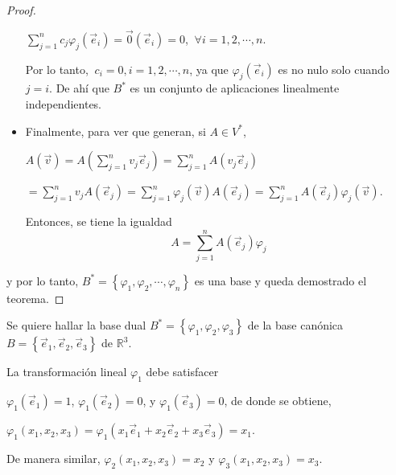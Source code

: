 \begin{corollary}
\begin{proof}
\begin{itemize}
 \bigskip 

 
$ \sum_{j=1}^n  c_j \varphi_j( \vec{e}_i)= \vec{0}( \vec{e}_i)=0   $, $ ~\forall i=1,2, \cdots, n$. 

\bigskip 

\noindent
Por lo tanto, $~c_i=0, i=1,2,\cdots, n$, ya que  $ \varphi_j( \vec{e}_i)   $ es no nulo solo cuando $j=i$. De ahí que $B^*$ es un conjunto de aplicaciones linealmente independientes.

\bigskip 

\item
Finalmente, para ver que generan, si $A \in V^*$, 

\bigskip 

$A( \vec{v})=A( \sum_{j=1}^n   v_j \vec{e}_j)= \sum_{j=1}^n A(  v_j \vec{e}_j)$

\bigskip 

$=\sum_{j=1}^n v_j A(\vec{e}_j)= \sum_{j=1}^n \varphi_j( \vec{v}) A(\vec{e}_j)=\sum_{j=1}^n A(\vec{e}_j)\varphi_j( \vec{v})      $.

\bigskip 

Entonces, se tiene la igualdad  $$   A= \sum_{j=1}^n A(\vec{e}_j)\varphi_j  $$
\end{itemize}

\bigskip 

\noindent
y por lo tanto, $B^*=\left\{ \varphi_1,\varphi_2,\cdots,\varphi_n\right\}$ es una base y queda demostrado el teorema.


\end{proof}
\end{corollary}




\bigskip

\bigskip

\bigskip

\begin{example}
Se quiere hallar la base dual  $ B^* =\left\{\varphi_1,\varphi_2, \varphi_3\right\} $ de la base canónica $B= \left\{\vec{e}_1,\vec{e}_2, \vec{e}_3\right\}$  de $\mathbb{R}^3$.

La transformación lineal $\varphi_1$ debe satisfacer

\bigskip

$\varphi_1 (\vec{e}_1)=1$, $\varphi_1 (\vec{e}_2)=0$, y $\varphi_1 (\vec{e}_3)=0$,
\noindent
de donde se obtiene, 

\bigskip

$\varphi_1( x_1,x_2,x_3)=\varphi_1( x_1 \vec{e}_1+ x_2 \vec{e}_2 + x_3 \vec{e}_3)=x_1$. 

\bigskip


De manera similar, $\varphi_2( x_1,x_2,x_3)=x_2$ y $\varphi_3( x_1,x_2,x_3)=x_3$. 

\end{example}


